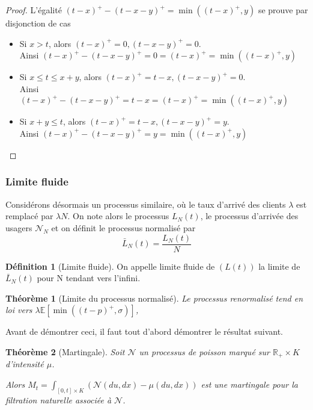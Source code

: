 \documentclass[12pt,a4paper]{article}
\newcommand{\E}[1]{\mathbb{E}\left[ #1 \right]}
\newcommand{\R}{\mathbb{R}}
\newcommand{\1}[1]{\mathbbm{1}_{\{#1\}} }
\newtheorem{theorem}{Théorème}
\theoremstyle{definition}
\newtheorem{definition}{Définition}
\begin{document}
{\begin{proof}
L'égalité $(t-x)^+-(t-x-y)^+ =  \min((t-x)^+,y)$ se prouve par disjonction de cas
\begin{itemize}
\item Si $x>t$, alors $(t-x)^+= 0, (t-x-y)^+ = 0$.\\
Ainsi $(t-x)^+-(t-x-y)^+ = 0 = (t-x)^+ = \min((t-x)^+,y)$

\item Si $x\leq t \leq x+y$, alors  $(t-x)^+= t-x, (t-x-y)^+ = 0$.\\
Ainsi $(t-x)^+-(t-x-y)^+ = t-x = (t-x)^+ = \min((t-x)^+,y)$

\item Si $x+y \leq t$, alors  $(t-x)^+= t-x, (t-x-y)^+ = y$.\\
Ainsi $(t-x)^+-(t-x-y)^+ = y = \min((t-x)^+,y)$ 
\end{itemize}
\end{proof}

\subsubsection{Limite fluide}
Considérons désormais un processus similaire, où le taux d'arrivé des clients $\lambda$ est remplacé par $\lambda N$. On note alors le processus $L_N(t)$, le processus d'arrivée des usagers $\mathcal{N}_N$ et on définit le processus normalisé par 
$$ \bar{L}_N(t) = \frac{L_N(t)}{N}$$


\begin{definition}[Limite fluide]

On appelle limite fluide de $(L(t)) $ la limite de $\bar{L}_N(t)$ pour N tendant vers l'infini.
\end{definition}

\begin{theorem}[Limite du processus normalisé]
\label{Limite_fluide}
Le processus renormalisé tend en loi vers $\lambda\E{\min((t-p)^+,\sigma)}$, 

\end{theorem}

Avant de démontrer ceci, il faut tout d'abord démontrer le résultat suivant.
\begin{theorem}[Martingale]
\label{processus_croissant}
Soit $\mathcal{N}$ un processus de poisson marqué sur $\R_+ \times K$ d'intensité $\mu$.

Alors $M_t = \int_{[0,t] \times K} \left(\mathcal{N}(du,dx) - \mu(du,dx)\right)$ est une martingale pour la filtration naturelle associée à $\mathcal{N}$.


\end{theorem}}
\end{document}
